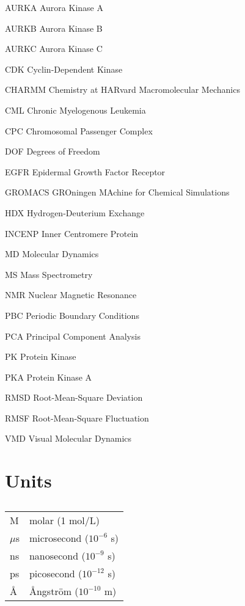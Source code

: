 \begin{abbreviations}
    \item[AURKA] Aurora Kinase A
    \item[AURKB] Aurora Kinase B
    \item[AURKC] Aurora Kinase C
    \item[CDK] Cyclin-Dependent Kinase
    \item[CHARMM] Chemistry at HARvard Macromolecular Mechanics
    \item[CML] Chronic Myelogenous Leukemia 
    \item[CPC] Chromosomal Passenger Complex
    \item[DOF] Degrees of Freedom
    \item[EGFR] Epidermal Growth Factor Receptor
    \item[GROMACS] GROningen MAchine for Chemical Simulations
    \item[HDX] Hydrogen-Deuterium Exchange
    \item[INCENP] Inner Centromere Protein
    \item[MD] Molecular Dynamics
    \item[MS] Mass Spectrometry
    \item[NMR] Nuclear Magnetic Resonance
    \item[PBC] Periodic Boundary Conditions
    \item[PCA] Principal Component Analysis
    \item[PK] Protein Kinase
    \item[PKA] Protein Kinase A
    \item[RMSD] Root-Mean-Square Deviation
    \item[RMSF] Root-Mean-Square Fluctuation
    \item[VMD] Visual Molecular Dynamics
\end{abbreviations}

\section{Units}
\begin{table}[H]
\caption*{}
\centering
\addtolength{\tabcolsep}{7pt} 
\begin{tabular}{ll}
\hline
M & molar (1 mol/L)
\\
$\mu$s & microsecond ($10^{-6}$ s)
\\
ns & nanosecond ($10^{-9}$ s)
\\
ps & picosecond ($10^{-12}$ s)
\\
Å & Ångström ($10^{-10}$ m)
\\
\hline
\end{tabular}
\addtolength{\tabcolsep}{7pt} 
\label{tab:units}
\end{table}